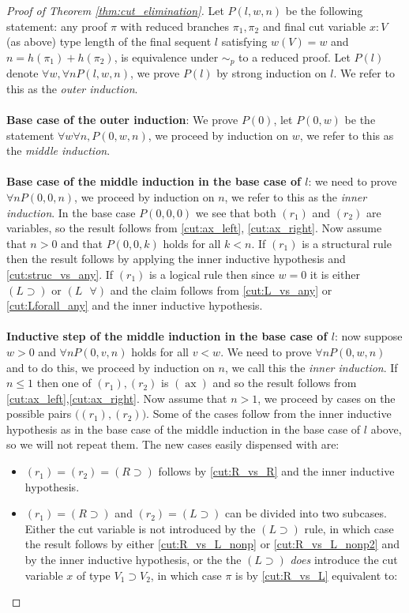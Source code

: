 \documentclass[12pt]{article}
\numberwithin{thm}{subsection}
\numberwithin{defn}{subsection}
\numberwithin{lemma}{subsection}
\numberwithin{example}{subsection}
\numberwithin{notation}{subsection}
\numberwithin{cor}{subsection}
\numberwithin{remark}{subsection}
\numberwithin{condition}{subsection}
\numberwithin{question}{subsection}
\numberwithin{construction}{subsection}
\newcommand{\ax}{(\operatorname{ax})}
\newcommand{\imp}{\supset}
\newcommand{\lquant}{(L\text{ }\forall)}
\theoremstyle{example}
\numberwithin{equation}{section}
\begin{document}
\begin{proof}[Proof of Theorem \ref{thm:cut_elimination}]
Let $P(l,w,n)$ be the following statement: any proof $\pi$ with reduced branches $\pi_1,\pi_2$ and final cut variable $x:V$ (as above) type length of the final sequent $l$ satisfying $w(V) = w$ and $n = h(\pi_1) + h(\pi_2)$, is equivalence under $\sim_p$ to a reduced proof. Let $P(l)$ denote $\forall w, \forall n P(l,w,n)$, we prove $P(l)$ by strong induction on $l$. We refer to this as the \emph{outer induction}.\\\\
%
\textbf{Base case of the outer induction}: We prove $P(0)$, let $P(0,w)$ be the statement $\forall w\forall n, P(0,w,n)$, we proceed by induction on $w$, we refer to this as the \emph{middle induction}.\\\\
%
\textbf{Base case of the middle induction in the base case of $l$}: we need to prove $\forall n P(0,0,n)$, we proceed by induction on $n$, we refer to this as the \emph{inner induction}. In the base case $P(0,0,0)$ we see that both $(r_1)$ and $(r_2)$ are variables, so the result follows from \eqref{cut:ax_left}, \eqref{cut:ax_right}. Now assume that $n > 0$ and that $P(0,0,k)$ holds for all $k < n$. If $(r_1)$ is a structural rule then the result follows by applying the inner inductive hypothesis and \eqref{cut:struc_vs_any}. If $(r_1)$ is a logical rule then since $w = 0$ it is either $(L\imp)$ or $\lquant$ and the claim follows from \eqref{cut:L_vs_any} or \eqref{cut:Lforall_any} and the inner inductive hypothesis.\\\\
%
\textbf{Inductive step of the middle induction in the base case of $l$}: now suppose $w > 0$ and $\forall n P(0,v,n)$ holds for all $v < w$. We need to prove $\forall n P(0,w,n)$ and to do this, we proceed by induction on $n$, we call this the \emph{inner induction}. If $n \leq 1$ then one of $(r_1),(r_2)$ is $\ax$ and so the result follows from \eqref{cut:ax_left},\eqref{cut:ax_right}. Now assume that $n > 1$, we proceed by cases on the possible pairs $\big((r_1),(r_2)\big)$. Some of the cases follow from the inner inductive hypothesis as in the base case of the middle induction in the base case of $l$ above, so we will not repeat them. The new cases easily dispensed with are:
\begin{itemize}
\item $(r_1) = (r_2) = (R\imp)$ follows by \eqref{cut:R_vs_R} and the inner inductive hypothesis.
\item $(r_1) = (R\imp)$ and $(r_2) = (L\imp)$ can be divided into two subcases. Either the cut variable is not introduced by the $(L\imp)$ rule, in which case the result follows by either \eqref{cut:R_vs_L_nonp} or \eqref{cut:R_vs_L_nonp2} and by the inner inductive hypothesis, or the the $(L\imp)$ \emph{does} introduce the cut variable $x$ of type $V_1 \imp V_2$, in which case $\pi$ is by \eqref{cut:R_vs_L} equivalent to:

\end{itemize}
\end{proof}
\end{document}
